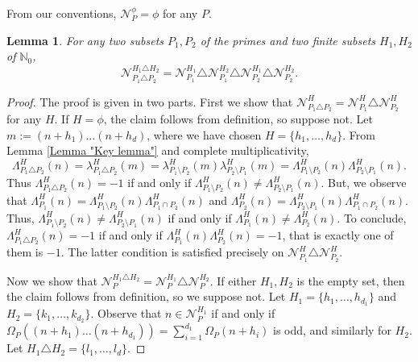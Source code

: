 \documentclass[12pt, a4paper]{amsart}
\newtheorem{lemma}{Lemma}
\theoremstyle{remark}
\theoremstyle{proof}
\numberwithin{equation}{section}
\numberwithin{assumption}{section}
\newcommand{\N}{\mathbb{N}}
\begin{document}
	From our conventions, $\mathcal{N}_P^\phi=\phi$ for any $P$.
	
	\begin{lemma}\label{Lemma "N_p recursion"}
		For any two subsets $ P_1, P_2 $ of the primes and two finite subsets $H_1,H_2$ of $\N_0$,
		\[
		\mathcal{N}_{P_1\triangle P_2}^{H_1\triangle H_2} = \mathcal{N}_{P_1}^{H_1} \triangle \mathcal{N}_{P_1}^{H_2} \triangle \mathcal{N}_{P_2}^{H_1} \triangle \mathcal{N}_{P_2}^{H_2}.
		\]
	\end{lemma}
	
	\begin{proof}
		The proof is given in two parts. First we show that $	\mathcal{N}_{P_1\triangle P_2}^{H} = \mathcal{N}_{P_1}^{H}\triangle \mathcal{N}_{P_2}^{H}$ for any $H$. If $H=\phi$, the claim follows from definition, so suppose not. Let $ m:= (n+h_1)\ldots(n+h_d) $, where we have chosen $H=\{h_1,\ldots,h_d\}$. From Lemma \ref{Lemma "Key lemma"} and complete multiplicativity,
		\[
		\Lambda_{P_1\triangle P_2}^H(n) = \lambda_{P_1\triangle P_2}^H(m) = \lambda_{P_1\setminus P_2}^H(m)\lambda_{P_2\setminus P_1}^H(m) = \Lambda_{P_1\setminus P_2}^H(n)\Lambda_{P_2\setminus P_1}^H(n).
		\]
		Thus $ \Lambda_{P_1\triangle P_2}^H(n) = -1 $ if and only if $ \Lambda_{P_1\setminus P_2}^H(n) \neq \Lambda_{P_2\setminus P_1}^H(n) $. But, we observe that $ \Lambda_{P_1}^H(n) = \Lambda_{P_1\setminus P_2}^H(n) \Lambda_{P_1\cap P_2}^H(n) $ and $ \Lambda_{P_2}^H(n) = \Lambda_{P_2\setminus P_1}^H(n)\Lambda_{P_1\cap P_2}^H(n) $. Thus, $ \Lambda_{P_1\setminus P_2}^H(n) \neq \Lambda_{P_2\setminus P_1}^H(n) $ if and only if $ \Lambda_{P_1}^H(n) \neq \Lambda_{P_2}^H(n) $. To conclude, $ \Lambda_{P_1\triangle P_2}^H(n)=-1 $ if and only if $ \Lambda_{P_1}^H(n) \Lambda_{P_2}^H(n) = -1 $, that is exactly one of them is $-1$. The latter condition is satisfied precisely on $ \mathcal{N}_{P_1}^{H} \triangle \mathcal{N}_{P_2}^{H} $.
		
		Now we show that $\mathcal{N}_P^{H_1\triangle H_2} = \mathcal{N}_P^{H_1}\triangle \mathcal{N}_P^{H_2}$. If either $H_1, H_2$ is the empty set, then the claim follows from definition, so we suppose not. Let $H_1=\{h_1,\ldots, h_{d_1}\}$ and $H_2 = \{k_1,\ldots, k_{d_2}\}$. Observe that $n\in \mathcal{N}_P^{H_1}$ if and only if $\Omega_P((n+h_1)\ldots(n+h_{d_1})) = \sum_{i=1}^{d_1}\Omega_P(n+h_i)$ is odd, and similarly for $H_2$. Let $H_1\triangle H_2 = \{l_1,\ldots,l_d\}$.
		

\end{proof}
\end{document}
